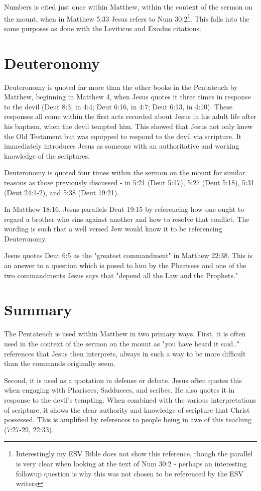 \documentclass[12pt]{turabian-researchpaper}
\begin{document}
Numbers is cited just once within Matthew, within the context of the sermon on the mount, when in Matthew 5:33 Jesus refers to Num 30:2\footnote{Interestingly my ESV Bible does not show this reference, though the parallel is very clear when looking at the text of Num 30:2 - perhaps an interesting followup question is why this was not chosen to be referenced by the ESV writers}. This falls into the same purposes as done with the Leviticus and Exodus citations.

\section{Deuteronomy}

Deuteronomy is quoted far more than the other books in the Pentateuch by Matthew, beginning in Matthew 4, when Jesus quotes it three times in response to the devil (Deut 8:3, in 4:4; Deut 6:16, in 4:7; Deut 6:13, in 4:10). These responses all come within the first acts recorded about Jesus in his adult life after his baptism, when the devil tempted him. This showed that Jesus not only knew the Old Testament but was equipped to respond to the devil via scripture. It immediately introduces Jesus as someone with an authoritative and working knowledge of the scriptures.

Deuteronomy is quoted four times within the sermon on the mount for similar reasons as those previously discussed - in 5:21 (Deut 5:17), 5:27 (Deut 5:18), 5:31 (Deut 24:1-2), and 5:38 (Deut 19:21).

In Matthew 18:16, Jesus parallels Deut 19:15 by referencing how one ought to regard a brother who sins against another and how to resolve that conflict. The wording is such that a well versed Jew would know it to be referencing Deuteronomy.

Jesus quotes Deut 6:5 as the "greatest commandment" in Matthew 22:38. This is an answer to a question which is posed to him by the Pharisees and one of the two commandments Jesus says that "depend all the Law and the Prophets."

\section{Summary}

The Pentateuch is used within Matthew in two primary ways. First, it is often used in the context of the sermon on the mount as "you have heard it said.." references that Jesus then interprets, always in such a way to be more difficult than the commands originally seem. 

Second, it is used as a quotation in defense or debate. Jesus often quotes this when engaging with Pharisees, Sadducees, and scribes. He also quotes it in response to the devil's tempting. When combined with the various interpretations of scripture, it shows the clear authority and knowledge of scripture that Christ possessed. This is amplified by  references to people being in awe of this teaching (7:27-29, 22:33).


\newpage
\printbibliography
\end{document}
